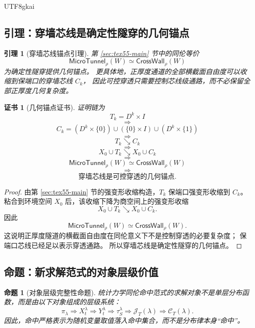 \documentclass[12pt]{article}
\newtheorem{proposition}{命题}[section]
\newtheorem{lemma}{引理}[section]
\newtheorem{Certificate}{证书}[section]
\newcommand{\MicroTunnel}{\mathsf{MicroTunnel}}
\newcommand{\CrossWall}{\mathsf{CrossWall}}
\begin{document}
\begin{CJK*}{UTF8}{gkai}
\subsection{引理：穿墙芯线是确定性隧穿的几何锚点}
\label{subsec:tex55-spine-anchor-lemma}

\begin{lemma}[穿墙芯线锚点引理]
\label{lem:tex55-crosswall-spine-anchor}
第 \ref{sec:tex55-main} 节中的同伦等价
\[
  \MicroTunnel_\rho(W)\simeq\CrossWall_\rho(W)
\]
为确定性隧穿提供几何锚点。
更具体地，正厚度通道的全部横截面自由度可以收缩到保端口的穿墙芯线 \(C_k\)，
因此可控穿透只需要控制芯线级通路，而不必保留全部正厚度几何复杂度。
\end{lemma}

\begin{Certificate}[几何锚点证书]
\label{cert:tex55-crosswall-spine-anchor}
证明链为
\[
  T_k=D^k\times I
\]
\[
  \Longrightarrow
\]
\[
  C_k=(D^k\times\{0\})\cup(\{0\}\times I)\cup(D^k\times\{1\})
\]
\[
  \Longrightarrow
\]
\[
  T_k\searrow C_k
\]
\[
  \Longrightarrow
\]
\[
  X_0\cup T_k\searrow X_0\cup C_k
\]
\[
  \Longrightarrow
\]
\[
  \MicroTunnel_\rho(W)\simeq\CrossWall_\rho(W)
\]
\[
  \Longrightarrow
\]
\[
  \text{穿墙芯线是可控穿透的几何锚点}.
\]
\end{Certificate}

\begin{proof}
由第 \ref{sec:tex55-main} 节的强变形收缩构造，\(T_k\) 保端口强变形收缩到 \(C_k\)。
粘合到环境空间 \(X_0\) 后，该收缩下降为商空间上的强变形收缩
\[
  X_0\cup T_k\searrow X_0\cup C_k.
\]
因此
\[
  \MicroTunnel_\rho(W)\simeq\CrossWall_\rho(W).
\]
这说明正厚度隧道的横截面自由度在同伦意义下不是控制穿透的必要复杂度；
保端口芯线已经足以表示穿透通路。
所以穿墙芯线是确定性隧穿的几何锚点。
\end{proof}

\subsection{命题：新求解范式的对象层级价值}
\label{subsec:tex55-paradigm-value-object-hierarchy}

\begin{proposition}[对象层级完整性命题]
\label{prop:tex55-object-hierarchy-value}
统计力学同伦命中范式的求解对象不是单层分布函数，而是由以下对象组成的层级系统：
\[
  \pi_\lambda
  \Rightarrow
  X_t^\lambda
  \Rightarrow
  Y_t^\lambda
  \Rightarrow
  \tau_S^\lambda
  \Rightarrow
  \mathcal J_T(\lambda)
  \Rightarrow
  \mathcal C_T(\lambda).
\]
因此，命中严格表示为随机变量取值落入命中集合，而不是分布律本身“命中”。
\end{proposition}


\end{CJK*}
\end{document}
